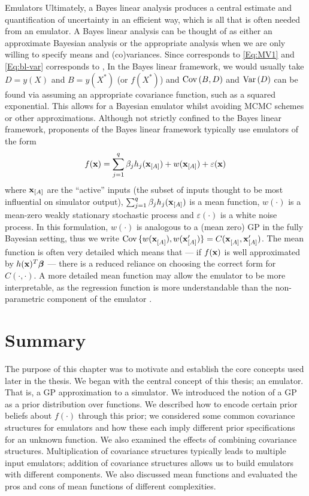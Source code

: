 \begin{chapter}{Emulators \label{Ch:Emulators}}
Ultimately, a Bayes linear analysis produces a central estimate and quantification of uncertainty in an efficient way, which is all that is often needed from an emulator. A Bayes linear analysis can be thought of as either an approximate Bayesian analysis or the appropriate analysis when we are only willing to specify means and (co)variances. Since  corresponds to \cref{Eq:MV1} and \cref{Eq:bl-var} corresponds to ,  In the Bayes linear framework, we would usually take $D = y(X)$ and $B = y(X^*)$ (or $f(X^*)$) and $\mathrm{Cov}\,(B, D)$ and $\mathrm{Var}\,(D)$ can be found via assuming an appropriate covariance function, such as a squared exponential. This allows for a Bayesian emulator whilst avoiding MCMC schemes or other approximations. Although not strictly confined to the Bayes linear framework, proponents of the Bayes linear framework typically use emulators of the form
\begin{equation}
  f(\mathbf{x}) = \sum_{j = 1}^q \beta_j h_j(\mathbf{x}_{[A]}) + w(\mathbf{x}_{[A]}) + \varepsilon(\mathbf{x})
\end{equation}
where $\mathbf{x}_{[A]}$ are the ``active'' inputs (the subset of inputs thought to be most influential on simulator output), $\sum_{j = 1}^q \beta_j h_j(\mathbf{x}_{[A]})$ is a mean function, $w(\cdot)$ is a mean-zero weakly stationary stochastic process and $\varepsilon(\cdot)$ is a white noise process. In this formulation, $w(\cdot)$ is analogous to a (mean zero) GP in the fully Bayesian setting, thus we write $\mathrm{Cov}\,\{w(\mathbf{x}^{}_{[A]}), w(\mathbf{x}'_{[A]})\}  = C(\mathbf{x}^{}_{[A]}, \mathbf{x}'_{[A]})$. The mean function is often very detailed which means that --- if $f(\mathbf{x})$ is well approximated by $h(\mathbf{x})^T \bm{\beta}$ --- there is a reduced reliance on choosing the correct form for $C(\cdot, \cdot)$. A more detailed mean function may allow the emulator to be more interpretable, as the regression function is more understandable than the non-parametric component of the emulator \citep{Bower2010, Vernon2019}.
\section{Summary}
The purpose of this chapter was to motivate and establish the core concepts used later in the thesis. We began with the central concept of this thesis; an emulator. That is, a GP approximation to a simulator. We introduced the notion of a GP as a prior distribution over functions. We described how to encode certain prior beliefs about $f(\cdot)$ through this prior; we considered some common covariance structures for emulators and how these each imply different prior specifications for an unknown function. We also examined the effects of combining covariance structures. Multiplication of covariance structures typically leads to multiple input emulators; addition of covariance structures allows us to build emulators with different components.  We also discussed mean functions and evaluated the pros and cons of mean functions of different complexities.


\end{chapter}
